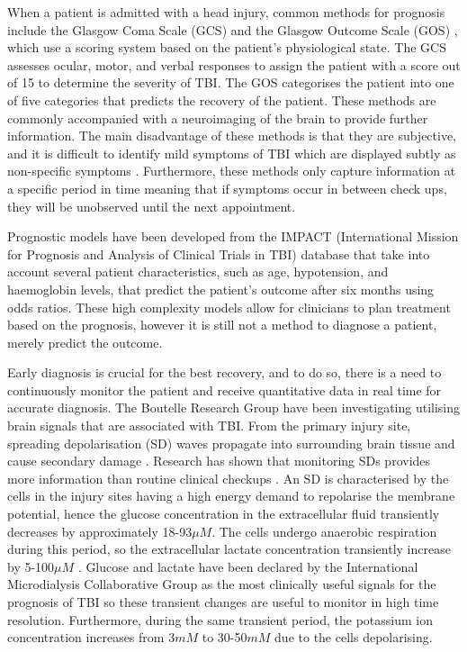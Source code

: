 When a patient is admitted with a head injury, common methods for prognosis include the Glasgow Coma Scale (GCS) \cite{WorldHealthOrganisation2006} and the Glasgow Outcome Scale (GOS) \cite{Jennett1975}, which use a scoring system based on the patient's physiological state. The GCS assesses ocular, motor, and verbal responses to assign the patient with a score out of 15 to determine the severity of TBI. The GOS categorises the patient into one of five categories that predicts the recovery of the patient. These methods are commonly accompanied with a neuroimaging of the brain to provide further information. The main disadvantage of these methods is that they are subjective, and it is difficult to identify mild symptoms of TBI which are displayed subtly as non-specific symptoms \cite{Bettermann2012}. Furthermore, these methods only capture information at a specific period in time meaning that if symptoms occur in between check ups, they will be unobserved until the next appointment. 

Prognostic models \cite{Steyerberg2008} have been developed from the IMPACT (International Mission for Prognosis and Analysis of Clinical Trials in TBI) database \cite{Maas2007} that take into account several patient characteristics, such as age, hypotension, and haemoglobin levels, that predict the patient's outcome after six months using odds ratios. These high complexity models allow for clinicians to plan treatment based on the prognosis, however it is still not a method to diagnose a patient, merely predict the outcome. 

Early diagnosis is crucial for the best recovery, and to do so, there is a need to continuously monitor the patient and receive quantitative data in real time for accurate diagnosis. The Boutelle Research Group have been investigating utilising brain signals that are associated with TBI. From the primary injury site, spreading depolarisation (SD) waves \cite{Leao1944} propagate into surrounding brain tissue and cause secondary damage \cite{Brain2011}. Research has shown that monitoring SDs provides more information than routine clinical checkups \cite{Hartings2011}. An SD is characterised by the cells in the injury sites having a high energy demand to repolarise the membrane potential, hence the glucose concentration in the extracellular fluid transiently decreases by approximately 18-93$\mu M$. The cells undergo anaerobic respiration during this period, so the extracellular lactate concentration transiently increase by 5-100$\mu M$ \cite{D.2010}. Glucose and lactate have been declared by the International Microdialysis Collaborative Group as the most clinically useful signals for the prognosis of TBI \cite{Hutchinson2015} so these transient changes are useful to monitor in high time resolution. Furthermore, during the same transient period, the potassium ion concentration increases \cite{Rogers2011} from 3$mM$ \cite{Katzman1976} to 30-50$mM$ \cite{Ayata2015} due to the cells depolarising. 



